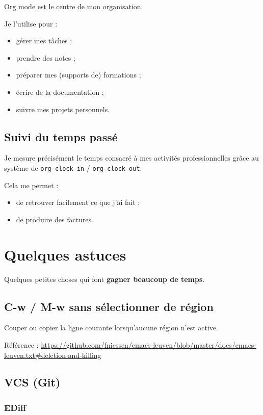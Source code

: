 \documentclass{mcreport}
\begin{document}
Org mode est le centre de mon organisation.

Je l'utilise pour :

\begin{itemize}
\item gérer mes tâches ;
\item prendre des notes ;
\item préparer mes (supports de) formations ;
\item écrire de la documentation ;
\item suivre mes projets personnels.
\end{itemize}
\section{\texorpdfstring{}{STRT} Suivi du temps passé\texorpdfstring{}{ (work)}}
\label{sec:orga126c25}

Je mesure précisément le temps consacré à mes activités professionnelles grâce
au système de \verb|org-clock-in| / \verb|org-clock-out|.

Cela me permet :

\begin{itemize}
\item de retrouver facilement ce que j'ai fait ;
\item de produire des factures.
\end{itemize}
\chapter{Quelques astuces}
\label{sec:orgdda8814}

Quelques petites choses qui font \textbf{gagner beaucoup de temps}.
\section{C-w / M-w sans sélectionner de région}
\label{sec:org580da4d}

Couper ou copier la ligne courante lorsqu'aucune région n'est active.

Référence :
\url{https://github.com/fniessen/emacs-leuven/blob/master/docs/emacs-leuven.txt\#deletion-and-killing}
\section{VCS (Git)}
\label{sec:org0c6a5ab}

\subsection*{EDiff}
\label{sec:org1e7e6ff}
\end{document}
